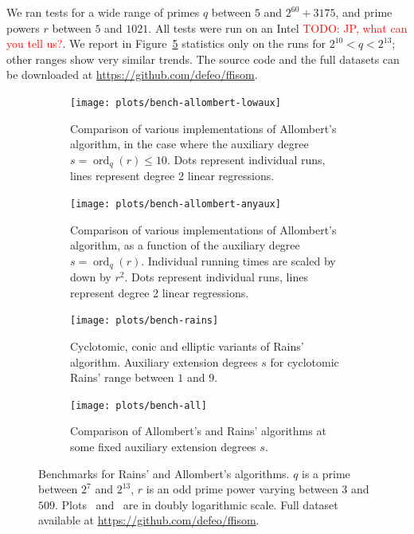 \documentclass[12pt]{article}
\theoremstyle{plain}
\theoremstyle{definition}
\newcommand{\todo}[1]{\textcolor{red}{TODO: #1}}
\DeclareMathOperator{\order}{ord} %
\newcounter{algorithm}
\begin{document}
We ran tests for a wide range of primes $q$ between $5$ and
$2^{60}+3175$, and prime powers $r$ between $5$ and $1021$. All tests
were run on an Intel \todo{JP, what can you tell us?}. We report in
Figure~\ref{fig:bench} statistics only on the runs for
$2^{10}<q<2^{13}$; other ranges show very similar trends. The source
code and the full datasets can be downloaded at
\url{https://github.com/defeo/ffisom}.



\begin{figure}
  \newlength{\mywidth}
  \setlength{\mywidth}{8cm}
  \centering

  \begin{subfigure}{.48\textwidth}
    \texttt{[image: plots/bench-allombert-lowaux]}
    \caption{Comparison of various implementations of Allombert's
      algorithm, in the case where the auxiliary degree
      $s=\order_q(r)\le 10$.  Dots represent individual runs, lines
      represent degree 2 linear regressions.}
    \label{fig:bench:allombert-lowaux}
  \end{subfigure}
  \hfill
  \begin{subfigure}{.48\textwidth}
    \noindent
    \texttt{[image: plots/bench-allombert-anyaux]}
    \caption{Comparison of various implementations of Allombert's
      algorithm, as a function of the auxiliary degree
      $s=\order_q(r)$.  Individual running times are scaled by down by
      $r^2$.  Dots represent individual runs, lines represent degree 2
      linear regressions.}
    \label{fig:bench:allombert-anyaux}
  \end{subfigure}

  \begin{subfigure}{.48\textwidth}
    \noindent
    \texttt{[image: plots/bench-rains]}
    \caption{Cyclotomic, conic and elliptic variants of Rains'
      algorithm.  Auxiliary extension degrees $s$ for cyclotomic
      Rains' range between $1$ and $9$.}
    \label{fig:bench:rains}
  \end{subfigure}
  \hfill
  \begin{subfigure}{.48\textwidth}
    \noindent
    \texttt{[image: plots/bench-all]}
    \caption{Comparison of Allombert's and Rains' algorithms at some
      fixed auxiliary extension degrees $s$.}
    \label{fig:bench:all}
  \end{subfigure}

  \caption{Benchmarks for Rains' and Allombert's algorithms. $q$ is a
    prime between $2^{7}$ and $2^{13}$, $r$ is an odd prime power
    varying between $3$ and $509$.  Plots~
    and~ are in doubly logarithmic scale. Full
    dataset available at \url{https://github.com/defeo/ffisom}.}
  \label{fig:bench}
\end{figure}
\end{document}
